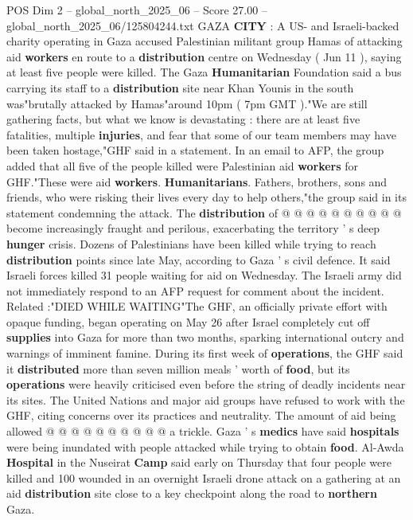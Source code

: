 \begin{textsample}{POS Dim 2 – global\_north\_2025\_06 – Score 27.00 – global\_north\_2025\_06/125804244.txt}  \label{ex:f2_pos_230}
GAZA \textbf{CITY} : A US- and Israeli-backed charity operating in Gaza accused Palestinian militant group Hamas of attacking aid \textbf{workers} en route to a \textbf{distribution} centre on Wednesday ( Jun 11 ), saying at least five people were killed.
The Gaza \textbf{Humanitarian} Foundation said a bus carrying its staff to a \textbf{distribution} site near Khan Younis in the south was"brutally attacked by Hamas"around 10pm ( 7pm GMT )."We are still gathering facts, but what we know is devastating : there are at least five fatalities, multiple \textbf{injuries}, and fear that some of our team members may have been taken hostage,"GHF said in a statement.
In an email to AFP, the group added that all five of the people killed were Palestinian aid \textbf{workers} for GHF."These were aid \textbf{workers}. \textbf{Humanitarians}.
Fathers, brothers, sons and friends, who were risking their lives every day to help others,"the group said in its statement condemning the attack.
The \textbf{distribution} of @ @ @ @ @ @ @ @ @ @ become increasingly fraught and perilous, exacerbating the territory ' s deep \textbf{hunger} crisis.
Dozens of Palestinians have been killed while trying to reach \textbf{distribution} points since late May, according to Gaza ' s civil defence.
It said Israeli forces killed 31 people waiting for aid on Wednesday.
The Israeli army did not immediately respond to an AFP request for comment about the incident.
Related :"DIED WHILE WAITING"The GHF, an officially private effort with opaque funding, began operating on May 26 after Israel completely cut off \textbf{supplies} into Gaza for more than two months, sparking international outcry and warnings of imminent famine.
During its first week of \textbf{operations}, the GHF said it \textbf{distributed} more than seven million meals ' worth of \textbf{food}, but its \textbf{operations} were heavily criticised even before the string of deadly incidents near its sites.
The United Nations and major aid groups have refused to work with the GHF, citing concerns over its practices and neutrality.
The amount of aid being allowed @ @ @ @ @ @ @ @ @ @ a trickle.
Gaza ' s \textbf{medics} have said \textbf{hospitals} were being inundated with people attacked while trying to obtain \textbf{food}.
Al-Awda \textbf{Hospital} in the Nuseirat \textbf{Camp} said early on Thursday that four people were killed and 100 wounded in an overnight Israeli drone attack on a gathering at an aid \textbf{distribution} site close to a key checkpoint along the road to \textbf{northern} Gaza.

\end{textsample}
